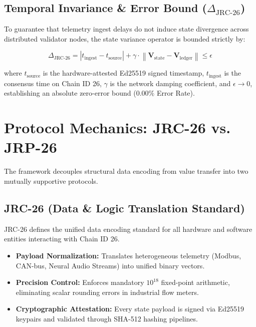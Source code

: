 \documentclass[10pt,journal,compsoc]{IEEEtran}
\begin{document}
\subsection{Temporal Invariance \& Error Bound ($\Delta_{\text{JRC-26}}$)}
To guarantee that telemetry ingest delays do not induce state divergence across distributed validator nodes, the state variance operator is bounded strictly by:

\begin{equation}
\Delta_{\text{JRC-26}} = \left| t_{\text{ingest}} - t_{\text{source}} \right| + \gamma \cdot \left\| \mathbf{V}_{\text{state}} - \mathbf{V}_{\text{ledger}} \right\| \le \epsilon
\end{equation}

where $t_{\text{source}}$ is the hardware-attested Ed25519 signed timestamp, $t_{\text{ingest}}$ is the consensus time on Chain ID 26, $\gamma$ is the network damping coefficient, and $\epsilon \to 0$, establishing an absolute zero-error bound ($0.00\%$ Error Rate).

\section{Protocol Mechanics: JRC-26 vs. JRP-26}

The framework decouples structural data encoding from value transfer into two mutually supportive protocols.

\subsection{JRC-26 (Data \& Logic Translation Standard)}
JRC-26 defines the unified data encoding standard for all hardware and software entities interacting with Chain ID 26.
\begin{itemize}
    \item \textbf{Payload Normalization:} Translates heterogeneous telemetry (Modbus, CAN-bus, Neural Audio Streams) into unified binary vectors.
    \item \textbf{Precision Control:} Enforces mandatory $10^{18}$ fixed-point arithmetic, eliminating scalar rounding errors in industrial flow meters.
    \item \textbf{Cryptographic Attestation:} Every state payload is signed via Ed25519 keypairs and validated through SHA-512 hashing pipelines.
\end{itemize}
\end{document}
